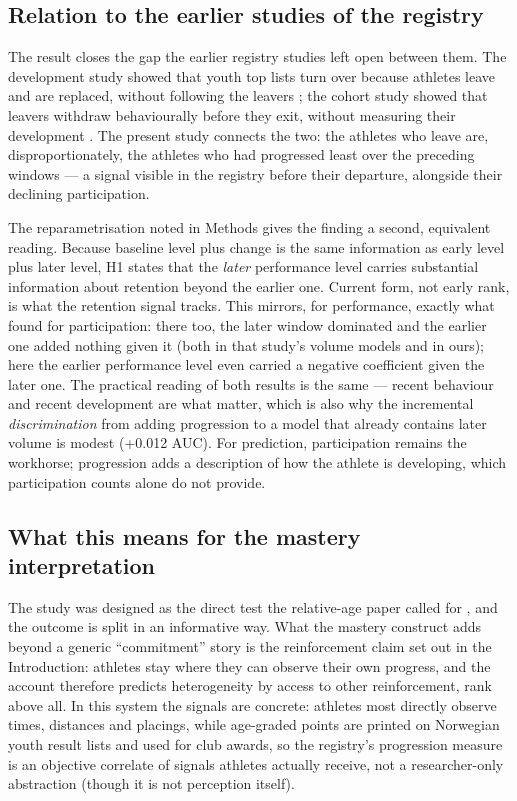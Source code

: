 \documentclass[12pt,a4paper]{article}
\begin{document}
\subsection{Relation to the earlier studies of the registry}

The result closes the gap the earlier registry studies left open between them. The development study showed that youth top lists turn over because athletes leave and are replaced, without following the leavers \citep{guttormsen2026development}; the cohort study showed that leavers withdraw behaviourally before they exit, without measuring their development \citep{guttormsen2026dropout}. The present study connects the two: the athletes who leave are, disproportionately, the athletes who had progressed least over the preceding windows --- a signal visible in the registry before their departure, alongside their declining participation.

The reparametrisation noted in Methods gives the finding a second, equivalent reading. Because baseline level plus change is the same information as early level plus later level, H1 states that the \emph{later} performance level carries substantial information about retention beyond the earlier one. Current form, not early rank, is what the retention signal tracks. This mirrors, for performance, exactly what \citet{guttormsen2026dropout} found for participation: there too, the later window dominated and the earlier one added nothing given it (both in that study's volume models and in ours); here the earlier performance level even carried a negative coefficient given the later one. The practical reading of both results is the same --- recent behaviour and recent development are what matter, which is also why the incremental \emph{discrimination} from adding progression to a model that already contains later volume is modest (+0.012 AUC). For prediction, participation remains the workhorse; progression adds a description of how the athlete is developing, which participation counts alone do not provide.

\subsection{What this means for the mastery interpretation}

The study was designed as the direct test the relative-age paper called for \citep{guttormsen2026rae}, and the outcome is split in an informative way. What the mastery construct adds beyond a generic ``commitment'' story is the reinforcement claim set out in the Introduction: athletes stay where they can observe their own progress, and the account therefore predicts heterogeneity by access to other reinforcement, rank above all. In this system the signals are concrete: athletes most directly observe times, distances and placings, while age-graded points are printed on Norwegian youth result lists and used for club awards, so the registry's progression measure is an objective correlate of signals athletes actually receive, not a researcher-only abstraction (though it is not perception itself).
\end{document}
